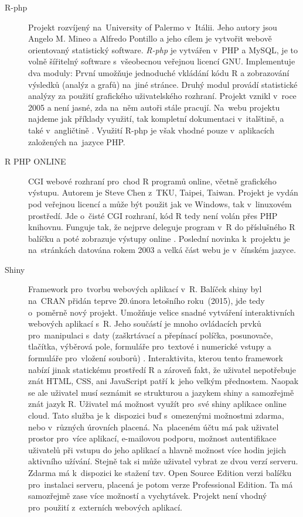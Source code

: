 \documentclass[thesis=B,czech]{FITthesis}[2012/06/26]
\begin{document}
\begin{description}
\item[R-php] \begin{sloppypar}Projekt rozvíjený na~University of Palermo v~Itálii. Jeho autory jsou Angelo M. Mineo a Alfredo Pontillo a jeho cílem je vytvořit webově orientovaný statistický software. \textit{R-php} je vytvářen v~PHP a MySQL, je to volně šířitelný software s~všeobecnou veřejnou licencí GNU. Implementuje dva moduly: První umožňuje jednoduché vkládání kódu R a zobrazování výsledků (analýz a grafů) na~jiné stránce. Druhý modul provádí statistické analýzy za použití grafického uživatelského rozhraní. Projekt vznikl v~roce 2005 a není jasné, zda na~něm autoři stále pracují. Na~webu projektu najdeme jak příklady využití, tak kompletní dokumentaci v~italštině, a také v~angličtině \cite{R-php}. Využití R-php je však vhodné pouze v~aplikacích založených na~jazyce PHP.  \end{sloppypar}

\item[R PHP ONLINE] \begin{sloppypar}CGI webové rozhraní pro~chod R programů online, včetně grafického výstupu. Autorem je Steve Chen z~TKU, Taipei, Taiwan. Projekt je vydán pod veřejnou licencí a může být použit jak ve Windows, tak v~linuxovém prostředí. Jde o~čisté CGI rozhraní, kód R tedy není volán přes PHP knihovnu. Funguje tak, že nejprve deleguje program v~R do příslušného R balíčku a poté zobrazuje výstupy online  \cite{R_PHP_ONLINE}. Poslední novinka k~projektu je na~stránkách datována rokem 2003 a velká část webu je v~čínském jazyce.\end{sloppypar}

\item[Shiny] \begin{sloppypar}Framework pro~tvorbu webových aplikací v~R. Balíček shiny byl na~CRAN přidán teprve 20.února letošního roku~(2015), jde tedy o~poměrně nový projekt. Umožňuje velice snadné vytváření interaktivních webových aplikací s~R. Jeho součástí je mnoho ovládacích prvků pro~manipulaci s~daty (zaškrtávací a přepínací políčka, posunovače, tlačítka, výběrová pole, formuláře pro~textové i numerické vstupy a formuláře pro~vložení souborů) \cite{Shiny}. Interaktivita, kterou tento framework nabízí jinak statickému prostředí R a zároveň fakt, že uživatel nepotřebuje znát HTML, CSS, ani JavaScript patří k~jeho velkým přednostem. Naopak se ale uživatel musí seznámit se strukturou a jazykem shiny a samozřejmě znát jazyk R. Uživatel má možnost využít pro~své shiny aplikace online cloud. Tato služba je k~dispozici buď s~omezenými možnostmi zdarma, nebo v~různých úrovních placená. Na~placeném účtu má pak uživatel prostor pro~více aplikací, e-mailovou podporu, možnost autentifikace uživatelů při vstupu do jeho aplikací a hlavně možnost více hodin jejich aktivního užívání. Stejně tak si může uživatel vybrat ze dvou verzí serveru. Zdarma má k~dispozici ke stažení tzv. Open Source Edition verzi balíčku pro~instalaci serveru, placená je potom verze Professional Edition. Ta má samozřejmě zase více možností a vychytávek. Projekt není vhodný pro~použití z~externích webových aplikací.\end{sloppypar}


\end{description}
\end{document}
